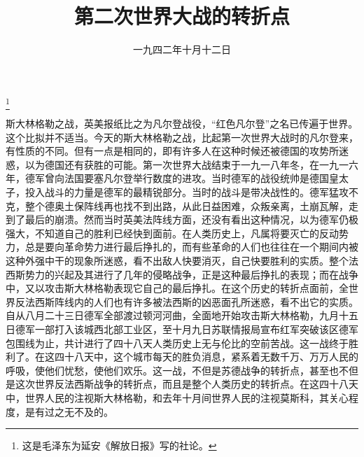 
\title{第二次世界大战的转折点}
\date{一九四二年十月十二日}
\thanks{这是毛泽东为延安《解放日报》写的社论。}
\maketitle


斯大林格勒之战，英美报纸比之为凡尔登战役，“红色凡尔登”之名已传遍于世界。这个比拟并不适当。今天的斯大林格勒之战，比起第一次世界大战时的凡尔登来，有性质的不同。但有一点是相同的，即有许多人在这种时候还被德国的攻势所迷惑，以为德国还有获胜的可能。第一次世界大战结束于一九一八年冬，在一九一六年，德军曾向法国要塞凡尔登举行数度的进攻。当时德军的战役统帅是德国皇太子，投入战斗的力量是德军的最精锐部分。当时的战斗是带决战性的。德军猛攻不克，整个德奥土保阵线再也找不到出路，从此日益困难，众叛亲离，土崩瓦解，走到了最后的崩溃。然而当时英美法阵线方面，还没有看出这种情况，以为德军仍极强大，不知道自己的胜利已经快到面前。在人类历史上，凡属将要灭亡的反动势力，总是要向革命势力进行最后挣扎的，而有些革命的人们也往往在一个期间内被这种外强中干的现象所迷惑，看不出敌人快要消灭，自己快要胜利的实质。整个法西斯势力的兴起及其进行了几年的侵略战争，正是这种最后挣扎的表现；而在战争中，又以攻击斯大林格勒表现它自己的最后挣扎。在这个历史的转折点面前，全世界反法西斯阵线内的人们也有许多被法西斯的凶恶面孔所迷惑，看不出它的实质。自从八月二十三日德军全部渡过顿河河曲，全面地开始攻击斯大林格勒，九月十五日德军一部打入该城西北部工业区，至十月九日苏联情报局宣布红军突破该区德军包围线为止，共计进行了四十八天人类历史上无与伦比的空前苦战。这一战终于胜利了。在这四十八天中，这个城市每天的胜负消息，紧系着无数千万、万万人民的呼吸，使他们忧愁，使他们欢乐。这一战，不但是苏德战争的转折点，甚至也不但是这次世界反法西斯战争的转折点，而且是整个人类历史的转折点。在这四十八天中，世界人民的注视斯大林格勒，和去年十月间世界人民的注视莫斯科，其关心程度，是有过之无不及的。

